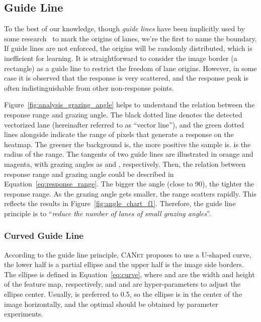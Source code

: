 \documentclass{article}
\newcommand\self{\textsc{CANet}\xspace}
\begin{document}
\subsection{Guide Line}
\label{sec:guide-line}
To the best of our knowledge, though \emph{guide lines} have been implicitly
used by some research~\cite{condlanenet} to mark the origins of lanes, we're the
first to name the boundary. If guide lines are not enforced, the origins will be
randomly distributed, which is inefficient for learning. It is straightforward
to consider the image border (a rectangle) as a guide line to restrict the
freedom of lane origins. However, in some case it is observed that the response
is very scattered, and the response peak is often indistinguishable from other
non-response points.

Figure~\ref{fig:analysis_grazing_angle} helps to understand the relation between
the response range and grazing angle. The black dotted line denotes the detected
vectorized lane (hereinafter referred to as ``vector line''), and the green
dotted lines alongside indicate the range of pixels that generate a response on
the heatmap. The greener the background is, the more positive the sample is. 
is the radius of the range. The tangents of two guide lines are illustrated in
orange and magenta, with grazing angles as  and ,
respectively. Then, the relation between response range and grazing angle could
be described in Equation~\eqref{eq:response_range}. The bigger the angle (close
to 90), the tighter the response range. As the grazing angle gets
smaller, the range scatters rapidly. This reflects the results in
Figure~\ref{fig:angle_chart_f1}. Therefore, the guide line principle is to
``\emph{reduce the number of lanes of small grazing angles}''.



\subsubsection{Curved Guide Line}
\label{sec:curved-guide-line}
According to the guide line principle, \self proposes to use a U-shaped curve,
the lower half is a partial ellipse and the upper half is the image side
borders. The ellipse is defined in Equation~\eqref{eq:curve}, where  and 
are the width and height of the feature map, respectively, and  and 
are hyper-parameters to adjust the ellipse center. Usually,  is preferred
to 0.5, so the ellipse is in the center of the image horizontally, and the
optimal  should be obtained by parameter experiments.
\end{document}
